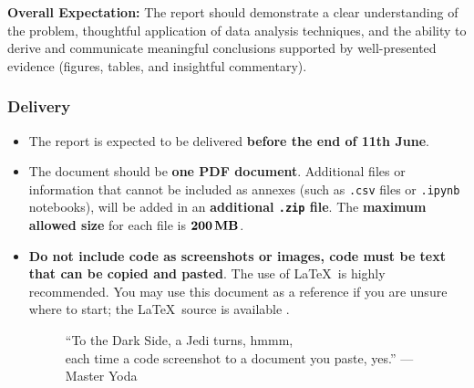 \documentclass[11pt]{exam}
\begin{document}
    \textbf{Overall Expectation:} The report should demonstrate a clear understanding of the problem, thoughtful application of data analysis techniques, and the ability to derive and communicate meaningful conclusions supported by well-presented evidence (figures, tables, and insightful commentary).

    \subsubsection{Delivery}
    \begin{itemize}
        \item The report is expected to be delivered \href{https://atenea.upc.edu/mod/assign/view.php?id=4865448}{} \textbf{before the end of 11th June}.
        \item The document should be \textbf{one PDF document}. Additional files or information that cannot be included as annexes (such as \texttt{.csv} files or \texttt{.ipynb} notebooks), will be added in an \textbf{additional \texttt{.zip} file}. The \textbf{maximum allowed size} for each file is $\SI{\mathbf{200}}{\mathbf{\mega\byte}}$. %
        \item \textbf{Do not include code as screenshots or images, code must be text that can be copied and pasted}. The use of \LaTeX\ is highly recommended. You may use this document as a reference if you are unsure where to start; the \LaTeX~source is available \href{https://github.com/joanfrancesc/Data-Analysis-Project}{}.

        \begin{figure}[htbp]
            \centering
            \caption{``To the Dark Side, a Jedi turns, hmmm, \\each time a code screenshot to a document you paste, yes.'' --- Master Yoda}
            \label{fig:NoScreenshots}
        \end{figure}
    \end{itemize}
\end{document}
